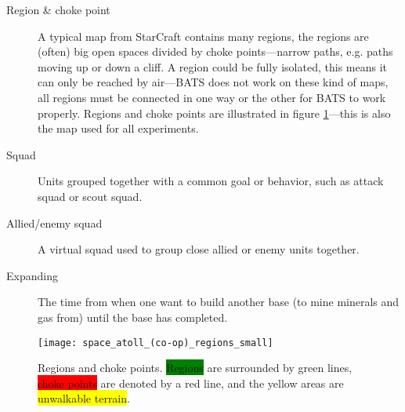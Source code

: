 \begin{description}
	\item[Region \& choke point] A typical map from StarCraft contains many regions, the regions are (often) big open spaces divided by choke points—narrow paths, e.g. paths moving up or down a cliff. A region could be fully isolated, this means it can only be reached by air—BATS does not work on these kind of maps, all regions must be connected in one way or the other for BATS to work properly. Regions and choke points are illustrated in figure \ref{fig:region_and_choke_points}—this is also the map used for all experiments.
	\item[Squad] Units grouped together with a common goal or behavior, such as attack squad or scout squad.
	\item[Allied/enemy squad] A virtual squad used to group close allied or enemy units together.
	\item[Expanding] The time from when one want to build another base (to mine minerals and gas from) until the base has completed.
\end{description}
\begin{figure}[htb]
	\centering
	\texttt{[image: space\_atoll\_(co-op)\_regions\_small]}
	\caption[Regions and choke points]{Regions and choke points. \colorbox{green}{Regions} are surrounded by green lines, \colorbox{Red}{choke points} are denoted by a red line, and the yellow areas are \colorbox{yellow}{unwalkable terrain}.}
	\label{fig:region_and_choke_points}
\end{figure}